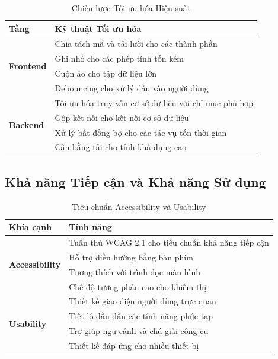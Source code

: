 \begin{table}[H]
\centering
\caption{Chiến lược Tối ưu hóa Hiệu suất}
\label{tab:performance-optimization}
\begin{tabular}{|p{3cm}|p{10cm}|}
\hline
\textbf{Tầng} & \textbf{Kỹ thuật Tối ưu hóa} \\
\hline
\multirow{4}{3cm}{\textbf{Frontend}} 
& Chia tách mã và tải lười cho các thành phần \\
\cline{2-2}
& Ghi nhớ cho các phép tính tốn kém \\
\cline{2-2}
& Cuộn ảo cho tập dữ liệu lớn \\
\cline{2-2}
& Debouncing cho xử lý đầu vào người dùng \\
\hline
\multirow{4}{3cm}{\textbf{Backend}} 
& Tối ưu hóa truy vấn cơ sở dữ liệu với chỉ mục phù hợp \\
\cline{2-2}
& Gộp kết nối cho kết nối cơ sở dữ liệu \\
\cline{2-2}
& Xử lý bất đồng bộ cho các tác vụ tốn thời gian \\
\cline{2-2}
& Cân bằng tải cho tính khả dụng cao \\
\hline
\end{tabular}
\end{table}

\subsection{Khả năng Tiếp cận và Khả năng Sử dụng}

\begin{table}[H]
\centering
\caption{Tiêu chuẩn Accessibility và Usability}
\label{tab:accessibility-usability}
\begin{tabular}{|p{4cm}|p{9cm}|}
\hline
\textbf{Khía cạnh} & \textbf{Tính năng} \\
\hline
\multirow{4}{4cm}{\textbf{Accessibility}} 
& Tuân thủ WCAG 2.1 cho tiêu chuẩn khả năng tiếp cận \\
\cline{2-2}
& Hỗ trợ điều hướng bằng bàn phím \\
\cline{2-2}
& Tương thích với trình đọc màn hình \\
\cline{2-2}
& Chế độ tương phản cao cho khiếm thị \\
\hline
\multirow{4}{4cm}{\textbf{Usability}} 
& Thiết kế giao diện người dùng trực quan \\
\cline{2-2}
& Tiết lộ dần dần các tính năng phức tạp \\
\cline{2-2}
& Trợ giúp ngữ cảnh và chú giải công cụ \\
\cline{2-2}
& Thiết kế đáp ứng cho nhiều thiết bị \\
\hline
\end{tabular}
\end{table}

